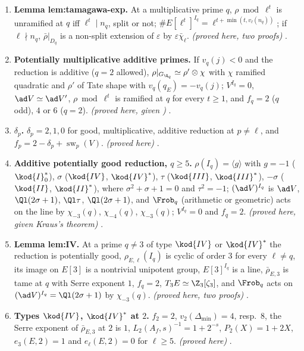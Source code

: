 \begin{enumerate}[label=\textbf{\thechapter.\arabic*}]
.
\item \textbf{Lemma lem:tamagawa-exp.} At a multiplicative prime $q$, $\rho\bmod\ell^t$ is unramified at $q$ iff $\ell^t\mid n_q$, split or not;
$\#E[\ell^t]^{I_q}=\ell^{t+\min(t,v_\ell(n_q))}$; if $\ell\nmid n_q$, $\bar\rho|_{D_q}$ is a non-split extension of $\varepsilon$ by $\varepsilon\bar\chi_\ell$.
\emph{(proved here, two proofs)} .
\item \textbf{Potentially multiplicative additive primes.} If $v_q(j)<0$ and the reduction is additive ($q=2$ allowed), $\rho|_{G_{\Q_q}}\simeq\rho'\otimes\chi$
with $\chi$ ramified quadratic and $\rho'$ of Tate shape with $v_q(q_E)=-v_q(j)$; $V^{I_q}=0$, $\ad V\simeq\ad V'$, $\rho\bmod\ell^t$ is ramified at $q$
for every $t\ge1$, and $f_q=2$ ($q$ odd), $4$ or $6$ ($q=2$). \emph{(proved here, given )} .
\item \textbf{$\delta_p$.} $\delta_p=2,1,0$ for good, multiplicative, additive reduction at $p\ne\ell$, and $f_p=2-\delta_p+\operatorname{sw}_p(V)$.
\emph{(proved here)} .
\item \textbf{Additive potentially good reduction, $q\ge5$.} $\rho(I_q)=\langle g\rangle$ with $g=-1$ ($\kod{I}_0^*$), $\sigma$ ($\kod{IV}$, $\kod{IV}^*$),
$\tau$ ($\kod{III}$, $\kod{III}^*$), $-\sigma$ ($\kod{II}$, $\kod{II}^*$), where $\sigma^2+\sigma+1=0$ and $\tau^2=-1$; $(\ad V)^{I_q}$ is $\ad V$, $\Ql(2\sigma+1)$,
$\Ql\tau$, $\Ql(2\sigma+1)$, and $\Frob_q$ (arithmetic or geometric) acts on the line by $\chi_{-3}(q)$, $\chi_{-4}(q)$, $\chi_{-3}(q)$; $V^{I_q}=0$ and
$f_q=2$. \emph{(proved here, given Kraus's theorem)} .
\item \textbf{Lemma lem:IV.} At a prime $q\ne3$ of type $\kod{IV}$ or $\kod{IV}^*$ the reduction is potentially good, $\rho_{E,\ell}(I_q)$ is cyclic
of order $3$ for every $\ell\ne q$, its image on $E[3]$ is a nontrivial unipotent group, $E[3]^{I_q}$ is a line, $\bar\rho_{E,3}$ is tame at $q$
with Serre exponent $1$, $f_q=2$, $T_3E\simeq\Z_3[\zeta_3]$, and $\Frob_q$ acts on $(\ad V)^{I_q}=\Ql(2\sigma+1)$ by $\chi_{-3}(q)$.
\emph{(proved here, two proofs)} .
\item \textbf{Types $\kod{IV}$, $\kod{IV}^*$ at $2$.} $f_2=2$, $v_2(\Delta_{\min})=4$, resp.\ $8$, the Serre exponent of $\bar\rho_{E,3}$ at $2$ is $1$,
$L_2(A_f,s)^{-1}=1+2^{-s}$, $P_2(X)=1+2X$, $e_3(E,2)=1$ and $e_\ell(E,2)=0$ for $\ell\ge5$. \emph{(proved here)} .

\end{enumerate}
